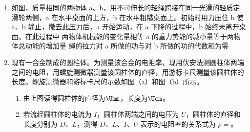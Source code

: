\documentclass[\gkver]{gaokaozhenti}
\begin{document}
\begin{enumerate}
\item
如图，质量相同的两物体 a、b，用不可伸长的轻绳跨接在同一光滑的轻质定滑轮两侧，a 在水平桌面的上方，b 在水平粗糙桌面上。初始时用力压住 b 使 a、b 静止，撤去此压力后，a 开始运动，在 a 下降的过程中，b 始终未离开桌面。在此过程中
{两物体机械能的变化量相等}
{a 的重力势能的减小量等于两物体总动能的增加量}
{绳的拉力对 a 所做的功与对 b 所做的功的代数和为零}

\item
现有一合金制成的圆柱体。为测量该合金的电阻率，现用伏安法测圆柱体两端之间的电阻，用螺旋测微器测量该圆柱体的直径，用游标卡尺测量该圆柱体的长度。螺旋测微器和游标卡尺的示数如图（a）和图（b）所示。
\begin{enumerate}
	\item
	由上图读得圆柱体的直径为$\Umm$，长度为$\Ucm$。
	\item
	若流经圆柱体的电流为 $I$，圆柱体两端之间的电压为 $U$，圆柱体的直径和长度分别为 $D$、$L$，测得 $D$、$L$、$I$、$U$ 表示的电阻率的关系式为 $\rho=$。
\end{enumerate}


\end{enumerate}
\end{document}
